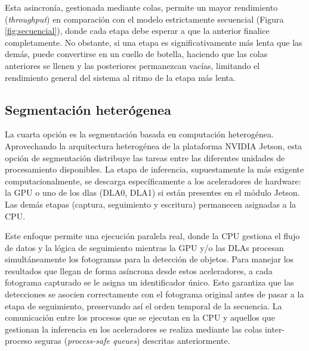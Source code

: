 \documentclass[11pt,spanish,listoffigures,listoftables]{tfgetsinf}
\begin{document}
Esta asincronía, gestionada mediante colas, permite un mayor rendimiento (\textit{throughput}) en comparación con el modelo estrictamente secuencial (Figura \ref{fig:secuencial}), donde cada etapa debe esperar a que la anterior finalice completamente. No obstante, si una etapa es significativamente más lenta que las demás, puede convertirse en un cuello de botella, haciendo que las colas anteriores se llenen y las posteriores permanezcan vacías, limitando el rendimiento general del sistema al ritmo de la etapa más lenta.


\subsection{Segmentación heterógenea} \label{sub:segmentacion_hardware}
La cuarta opción es la segmentación basada en computación heterogénea. Aprovechando la arquitectura heterogénea de la plataforma NVIDIA Jetson, esta opción de segmentación distribuye las tareas entre las diferentes unidades de procesamiento disponibles. La etapa de inferencia, supuestamente la más exigente computacionalmente, se descarga específicamente a los aceleradores de hardware: la GPU o uno de los \glspl{dla} (DLA0, DLA1) si están presentes en el módulo Jetson. Las demás etapas (captura, seguimiento y escritura) permanecen asignadas a la CPU.

Este enfoque permite una ejecución paralela real, donde la CPU gestiona el flujo de datos y la lógica de seguimiento mientras la GPU y/o las DLAs procesan simultáneamente los fotogramas para la detección de objetos. Para manejar los resultados que llegan de forma asíncrona desde estos aceleradores, a cada fotograma capturado se le asigna un identificador único. Esto garantiza que las detecciones se asocien correctamente con el fotograma original antes de pasar a la etapa de seguimiento, preservando así el orden temporal de la secuencia. La comunicación entre los procesos que se ejecutan en la CPU y aquellos que gestionan la inferencia en los aceleradores se realiza mediante las colas inter-proceso seguras (\textit{process-safe queues}) descritas anteriormente.
\end{document}
